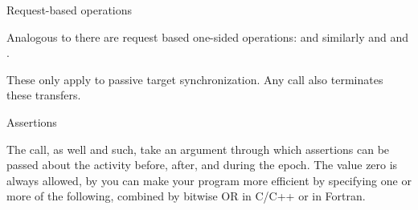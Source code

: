  {Request-based operations}

Analogous to  there are request based one-sided operations:
%
%
and similarly  and
and .

These only apply to passive target synchronization.
Any  call also terminates these transfers.

 {Assertions}
\label{sec:mpi-assert}

The  call, as well  and such, take an argument
through which assertions can be passed about the activity before, after, and during the epoch.
The value zero is always allowed, by you can make your program more efficient by specifying
one or more of the following, combined by bitwise OR in C/C++ or
 in Fortran.

